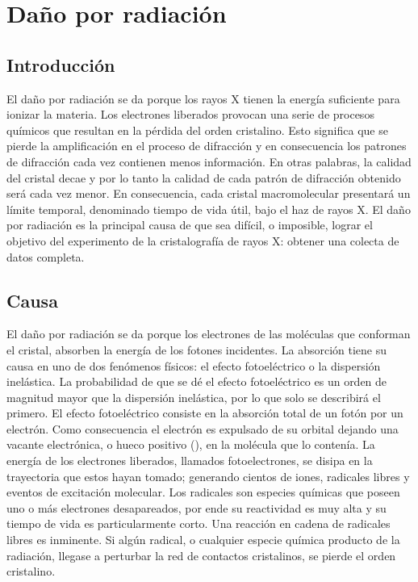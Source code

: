 \section{Daño por radiación}
\subsection{Introducción}
El daño por radiación se da porque los rayos X tienen la energía suficiente para ionizar la materia. Los electrones liberados provocan una serie de procesos químicos que resultan en la pérdida del orden cristalino. Esto significa que se pierde la amplificación en el proceso de difracción y en consecuencia los patrones de difracción cada vez contienen menos información. En otras palabras, la calidad del cristal decae y por lo tanto la calidad de cada patrón de difracción obtenido será cada vez menor. En consecuencia, cada cristal macromolecular presentará un límite temporal, denominado tiempo de vida útil, bajo el haz de rayos X. El daño por radiación es la principal causa de que sea difícil, o imposible, lograr el objetivo del experimento de la cristalografía de rayos X: obtener una colecta de datos completa.  
\subsection{Causa}
El daño por radiación se da porque los electrones de las moléculas que conforman el cristal, absorben la energía de los fotones incidentes. La absorción tiene su causa en uno de dos fenómenos físicos: el efecto fotoeléctrico o la dispersión inelástica. La probabilidad de que se dé el efecto fotoeléctrico es un orden de magnitud mayor que la dispersión inelástica, por lo que solo se describirá el primero. El efecto fotoeléctrico consiste en la absorción total de un fotón por un electrón. Como consecuencia el electrón es expulsado de su orbital dejando una vacante electrónica, o hueco positivo (), en la molécula que lo contenía. La energía de los electrones liberados, llamados fotoelectrones, se disipa en la trayectoria que estos hayan tomado; generando cientos de iones, radicales libres y eventos de excitación molecular. Los radicales son especies químicas que poseen uno o más electrones desapareados, por ende su reactividad es muy alta y su tiempo de vida es particularmente corto. Una reacción en cadena de radicales libres es inminente. Si algún radical, o cualquier especie química producto de la radiación, llegase a perturbar la red de contactos cristalinos, se pierde el orden cristalino. 
